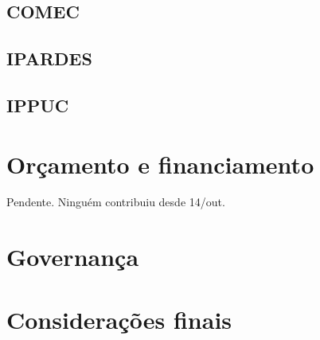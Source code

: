 	\section{COMEC}
	
	\section{IPARDES}
	
	\section{IPPUC}
	
	\chapter{Orçamento e financiamento}
	
	Pendente. Ninguém contribuiu desde 14/out.
	
	\chapter{Governança}
	
	\chapter{Considerações finais}
	
	
	\postextual
	
	
	
	
	\renewcommand{\glossaryname}{Glossário}
	\renewcommand*{\glsseeformat}[3][\seename]{\textit{#1}
		\glsseelist{#2}}
	
